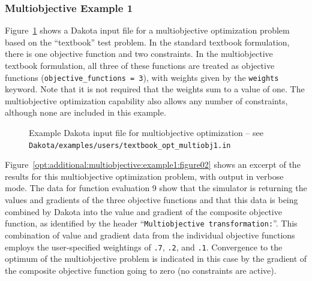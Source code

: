 \subsubsection{Multiobjective Example 1}
\label{opt:additional:multiobjective:example1}

Figure~\ref{opt:additional:multiobjective:example1:figure01} shows a
Dakota input file for a multiobjective optimization problem based on
the ``textbook'' test problem.  In the standard textbook formulation,
there is one objective function and two constraints. In the
multiobjective textbook formulation, all three of these functions are
treated as objective functions (\texttt{objective\_functions = 3}),
with weights given by the \texttt{weights} keyword. Note that it is
not required that the weights sum to a value of one. The
multiobjective optimization capability also allows any number of
constraints, although none are included in this example.

\begin{figure}
\centering
\begin{bigbox}
\begin{small}
\end{small}
\end{bigbox}
\caption{Example Dakota input file for multiobjective optimization --
see \texttt{Dakota/examples/users/textbook\_opt\_multiobj1.in} }
\label{opt:additional:multiobjective:example1:figure01}
\end{figure}

Figure~\ref{opt:additional:multiobjective:example1:figure02} shows an
excerpt of the results for this multiobjective optimization problem,
with output in verbose mode. The data for function evaluation 9 show
that the simulator is returning the values and gradients of the three
objective functions and that this data is being combined by Dakota
into the value and gradient of the composite objective function, as
identified by the header ``\texttt{Multiobjective
  transformation:}''. This combination of value and gradient data from
the individual objective functions employs the user-specified
weightings of \texttt{.7}, \texttt{.2}, and \texttt{.1}. Convergence
to the optimum of the multiobjective problem is indicated in this case
by the gradient of the composite objective function going to zero (no
constraints are active).

